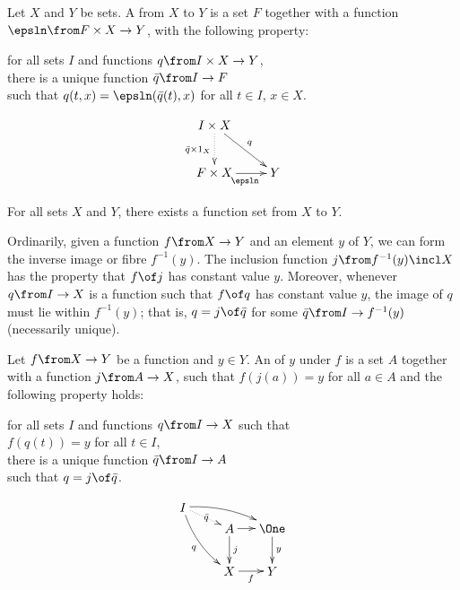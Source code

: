 \documentclass[12pt]{article}
\begin{document}
\begin{dfn}
Let $X$ and $Y$ be sets.  A  from $X$ to $Y$ is a
set $F$ together with a function $\epsln\from F \times X \to Y$, with the
following property: 
% 
\begin{defnprop}
for all sets $I$ and functions $q\from I \times X \to Y$,\\
there is a unique function $\bar{q}\from I \to F$\\
such that 
$q(t, x) = \epsln (\bar{q}(t), x)$ for all $t \in I$, $x \in X$.
\end{defnprop}
\end{dfn}
\[
\xymatrix{
I \times X \ar@{.>}[d]_{\bar{q} \times 1_X} \ar[rd]^q   &       \\
F \times X \ar[r]_\epsln                                &Y
}
\]
% 
\begin{axiom}{6}
For all sets $X$ and $Y$, there exists a function set from $X$ to $Y$.
\end{axiom}


% 
Ordinarily, given a function $f\from X \to Y$ and an element $y$ of $Y$, we
can form the inverse image or fibre $f^{-1}(y)$.  The inclusion function $j
\from f^{-1}(y) \incl X$ has the property that $f\of j$ has constant value
$y$.  Moreover, whenever $q \from I \to X$ is a function such that $f \of
q$ has constant value $y$, the image of $q$ must lie within $f^{-1}(y)$;
that is, $q = j \of \bar{q}$ for some $\bar{q}\from I \to f^{-1}(y)$
(necessarily unique).

\begin{dfn}
Let $f\from X \to Y$ be a function and $y \in Y$.  An 
of $y$ under $f$ is a set $A$ together with a function $j\from A \to X$, such
that $f(j(a)) = y$ for all $a \in A$ and the following property holds:
% 
\begin{defnprop}
for all sets $I$ and functions $q \from I \to X$ such that\\
\mbox{}\quad $f(q(t)) = y$ for all $t \in I$,\\
there is a unique function $\bar{q} \from I \to A$\\ 
such that $q = j \of \bar{q}$.  
\end{defnprop}
\end{dfn}
\[
\begin{xy}
(0,12)*+{A}="inv";
(12,12)*+{\One}="one";
(0,0)*+{X}="dom";
(12,0)*+{Y}="cod";
(-13,18)*+{I}="test";
{\ar^j "inv"; "dom"};
{\ar "inv"; "one"};
{\ar_f "dom"; "cod"};
{\ar^y "one"; "cod"};
{\ar@/_/_{q} "test"; "dom"};
{\ar@/^/ "test"; "one"};
{\ar@{.>}|{\bar{q}} "test"; "inv"};
\end{xy}
\]
\end{document}
